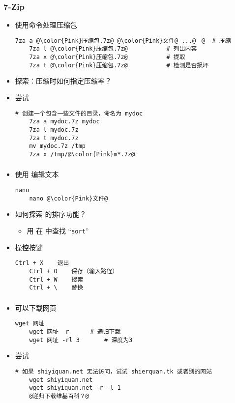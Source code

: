 \begin{CJK}{UTF8}{gbsn}
\begin{frame} [fragile]
	\frametitle{7-Zip}
	\begin{itemize}
	\item 使用命令处理压缩包
	\begin{lstlisting}[style=bashstyle, gobble=4, texcl, escapechar=@]
	7za a @\color{Pink}压缩包.7z@ @\color{Pink}文件@ ...@　@	# 压缩
	7za l @\color{Pink}压缩包.7z@			 # 列出内容
	7za x @\color{Pink}压缩包.7z@			 # 提取
	7za t @\color{Pink}压缩包.7z@			 # 检测是否损坏
	\end{lstlisting}
	\item 探索：压缩时如何指定压缩率？
	\item 尝试
	\begin{lstlisting}[style=bashstyle, gobble=4, texcl, escapechar=@]
	# 创建一个包含一些文件的目录，命名为 mydoc
	7za a mydoc.7z mydoc
	7za l mydoc.7z
	7za t mydoc.7z
	mv mydoc.7z /tmp
	7za x /tmp/@\color{Pink}m*.7z@
	\end{lstlisting}
	\end{itemize}
\end{frame}

\begin{frame} [fragile]
	\frametitle{}
	\linespread{1.25}
	\begin{itemize}
	\item 使用  编辑文本
	\begin{lstlisting}[style=bashstyle, gobble=4, texcl, escapechar=@]
	nano
	nano @\color{Pink}文件@
	\end{lstlisting}
	\item 如何探索  的排序功能？
		\begin{itemize}
		\item 用  在  中查找 ``\texttt{sort}''
		\end{itemize}
	\item 操控按键
	\begin{lstlisting}[basicstyle=\ttfamily]
	Ctrl + X	退出
	Ctrl + O	保存（输入路径）
	Ctrl + W	搜索
	Ctrl + \	替换
	\end{lstlisting}
	\end{itemize}
\end{frame}

\begin{frame} [fragile]
	\frametitle{}
	\linespread{1.25}
	\begin{itemize}
	\item {}可以下载网页
	\begin{lstlisting}[style=bashstyle, gobble=4, texcl]
	wget 网址
	wget 网址 -r		# 递归下载
	wget 网址 -rl 3		# 深度为3
	\end{lstlisting}
	\item 尝试
	\begin{lstlisting}[style=bashstyle, gobble=4, texcl, escapechar=@]
	# 如果 shiyiquan.net 无法访问，试试 shierquan.tk 或者别的网站
	wget shiyiquan.net
	wget shiyiquan.net -r -l 1
	@递归下载维基百科？@
	\end{lstlisting}
	\end{itemize}
\end{frame}


\end{CJK}
